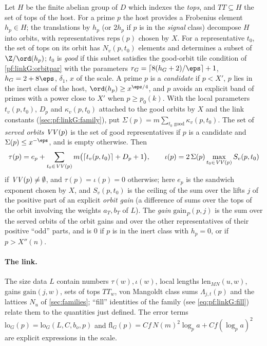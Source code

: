 \begin{definition}\label{pf:linkG:orbitdata}
Let $H$ be the finite abelian group of $D$ which indexes the \emph{tops}, and $TT\subseteq H$ the set of tops of
the host. For a prime $p$ the host provides a Frobenius element $h_p\in H$; the translations by $h_p$ (or $2h_p$ if
$p$ is in the \emph{signal} class) decompose $H$ into orbits, with representatives $\mathrm{reps}(p)$ chosen by
$X$. For a representative $t_0$, the set of tops on its orbit has $N_v(p,t_0)$ elements and determines a subset of
$\Z/\ord(h_p)$; $t_0$ is \emph{good} if this subset satisfies the good-orbit tile condition of
\cref{pf:linkG:orbitpar} with the parameters $r_G=\lceil8(h_G+2)/\eps\rceil+1$, $h_G=2+8\eps$, $\delta_1$, $x$ of
the scale. A prime $p$ is a \emph{candidate} if $p<X'$, $p$ lies in the inert class of the host,
$\ord(h_p)\ge x^{\eps/4}$, and $p$ avoids an explicit band of primes with a power close to $X'$ when $p\ge p_0(k)$.
With the local parameters $t_v(p,t_0)$, $D_p$ and $\kappa_v(p,t_0)$ attached to the good orbits by $X$ and the link
constants (\cref{sec:pf:linkG:family}), put $\Sigma(p)=m\sum_{t_0\text{ good}}\kappa_v(p,t_0)$. The set of \emph{served
orbits} $\mathit{VV}(p)$ is the set of good representatives if $p$ is a candidate and $\Sigma(p)\le x^{-\eps}$, and is
empty otherwise. Then
\begin{equation}\label{eq:pf:linkG:tauio}
\tau(p)=e_p+\sum_{t_0\in\mathit{VV}(p)}m\bigl(\lceil t_v(p,t_0)\rceil+D_p+1\bigr),\qquad
\iota(p)=2\,\Sigma(p)\max_{t_0\in\mathit{VV}(p)}S_v(p,t_0)
\end{equation}
if $\mathit{VV}(p)\ne\emptyset$, and $\tau(p)=\iota(p)=0$ otherwise; here $e_p$ is the sandwich exponent chosen by
$X$, and $S_v(p,t_0)$ is the ceiling of the sum over the lifts $j$ of the positive part of an explicit
\emph{orbit gain} (a difference of sums over the tops of the orbit involving the weights $a_T,b_T$ of $L$). The
\emph{gain} $\mathrm{gain}_P(p,j)$ is the sum over the served orbits of the orbit gains and over the other
representatives of their positive ``odd'' parts, and is $0$ if $p$ is in the inert class with $h_p=0$, or if
$p>X''(n)$.
\end{definition}

\paragraph{The link.}
The size data $L$ contain numbers $\tau(w),\iota(w)$, local lengths $\mathrm{len}_{MN}(u,w)$, gains
$\mathrm{gain}(j,w)$, sets of tops $TT_w$, von Mangoldt class sums $\Lambda_{j,t}(p)$ and the lattices $N_u$ of
\cref{sec:families}; ``fill'' identities of the family (see \eqref{eq:pf:linkG:fill}) relate them to the quantities just
defined. The error terms $\mathrm{lo}_G(p)=\mathrm{lo}_G(L,C,b_o,p)$ and
$\mathrm{fl}_G(p)=Cf\,N(m)^2\log_pa+Cf(\log_pa)^2$ are explicit expressions in the scale.

